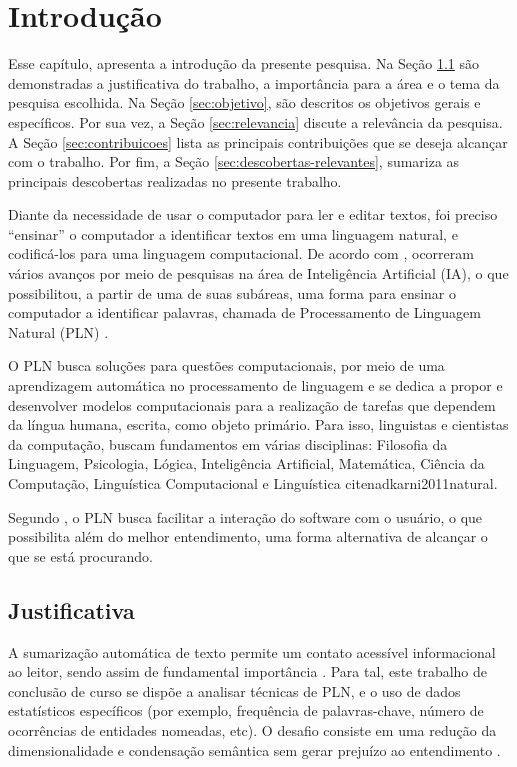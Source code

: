 \chapter{Introdução}
\label{cap:introducao}

Esse capítulo, apresenta a introdução da presente pesquisa. Na Seção \ref{sec:justificativa} são demonstradas a justificativa do trabalho, a importância para a área e o tema da pesquisa escolhida. Na Seção \ref{sec:objetivo}, são descritos os objetivos gerais e específicos. Por sua vez, a Seção \ref{sec:relevancia} discute a relevância da pesquisa. A Seção \ref{sec:contribuicoes} lista as principais contribuições que se deseja alcançar com o trabalho. Por fim, a Seção \ref{sec:descobertas-relevantes}, sumariza as principais descobertas realizadas no presente trabalho.

Diante da necessidade de usar o computador para ler e editar textos, foi preciso ``ensinar'' o computador a identificar textos em uma linguagem natural, e codificá-los para uma linguagem computacional. De acordo com , ocorreram vários avanços por meio de pesquisas na área de Inteligência Artificial (IA), o que possibilitou, a partir de uma de suas subáreas, uma forma para ensinar o computador a identificar palavras, chamada de Processamento de Linguagem Natural (PLN) \cite{nadkarni2011natural}.

O PLN \cite{nadkarni2011natural} busca soluções para questões computacionais, por meio de uma 
aprendizagem automática no processamento de linguagem e se dedica a propor e desenvolver modelos computacionais para a realização de tarefas que dependem da língua humana, escrita, como objeto primário. Para isso, linguistas e cientistas da computação, buscam fundamentos em várias disciplinas: Filosofia da Linguagem, Psicologia, Lógica, Inteligência Artificial, Matemática, Ciência da Computação, Linguística 
Computacional e Linguística cite{nadkarni2011natural}.

Segundo , o PLN
busca facilitar a interação do software com o usuário, o que possibilita além do
melhor entendimento, uma forma alternativa de alcançar o que se está procurando.

\section{Justificativa}
\label{sec:justificativa}

A sumarização automática de texto \cite{gonzalezlima} permite um contato acessível informacional ao leitor, sendo assim de 
fundamental importância \cite{leite2010estudo}. Para tal, este trabalho de conclusão de curso se dispõe a analisar técnicas de PLN,
e o uso de dados estatísticos específicos (por exemplo, frequência de  palavras-chave, número de ocorrências de entidades nomeadas, 
etc). O desafio consiste em uma redução da dimensionalidade e condensação semântica sem gerar prejuízo ao entendimento 
\cite{souza2017metodo}.

